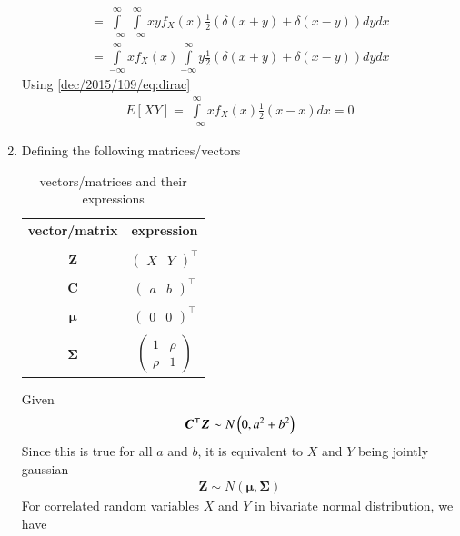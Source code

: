 \begin{enumerate}
\begin{align}
=\int\limits_{-\infty}^{\infty}\int\limits_{-\infty}^{\infty}xyf_X(x)\frac{1}{2}(\delta(x+y)+\delta(x-y)) dy dx\\
=\int\limits_{-\infty}^{\infty} xf_X(x)\int\limits_{-\infty}^{\infty}y\frac{1}{2}(\delta(x+y)+\delta(x-y)) dy dx
\end{align}
Using \eqref{dec/2015/109/eq:dirac}
\begin{align}
E[XY]=\int\limits_{-\infty}^{\infty}xf_X(x)\frac{1}{2}(x-x)dx=0
\end{align}
\item
Defining the following matrices/vectors
\begin{table}[h!]
\centering
\begin{tabular}{ |c|c|} 
\hline
\textbf{vector/matrix} & \textbf{expression} \\
\hline&\\[-1em]
$\boldsymbol{Z}$& $\begin{pmatrix} X &Y\end{pmatrix}^\top$\\[2pt]
\hline&\\[-1em]
$\boldsymbol{C}$&$\begin{pmatrix} a &b\end{pmatrix}^\top$  \\[2pt]
\hline&\\[-1em]
$\boldsymbol{\mu}$&$\begin{pmatrix} 0 &0\end{pmatrix}^\top$  \\[2pt]
\hline&\\[-1em]
$\boldsymbol{\Sigma}$&$\begin{pmatrix}1&\rho\\\rho&1\end{pmatrix}$ \\
\hline
\end{tabular}
\caption{vectors/matrices and their expressions}
\label{dec/2015/109/table1}
\end{table}
Given
\begin{align}
\boldsymbol{C^\top Z}\sim N\left(0,a^2+b^2\right)
\end{align}
Since this is true for all $a$ and $b$, it is equivalent to $X$ and $Y$ being jointly gaussian
\begin{align}
\boldsymbol{Z}\sim N(\boldsymbol{\mu},\boldsymbol{\Sigma})
\end{align}
For correlated random variables $X$ and $Y$ in bivariate normal distribution, we have

\end{enumerate}
